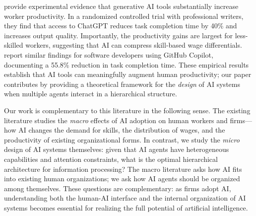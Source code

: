 \citet{noy2023experimental} provide experimental evidence that generative AI tools substantially increase worker productivity. In a randomized controlled trial with professional writers, they find that access to ChatGPT reduces task completion time by 40\% and increases output quality. Importantly, the productivity gains are largest for less-skilled workers, suggesting that AI can compress skill-based wage differentials. \citet{peng2023impact} report similar findings for software developers using GitHub Copilot, documenting a 55.8\% reduction in task completion time. These empirical results establish that AI tools can meaningfully augment human productivity; our paper contributes by providing a theoretical framework for the \emph{design} of AI systems when multiple agents interact in a hierarchical structure.

Our work is complementary to this literature in the following sense. The existing literature studies the \emph{macro} effects of AI adoption on human workers and firms---how AI changes the demand for skills, the distribution of wages, and the productivity of existing organizational forms. In contrast, we study the \emph{micro} design of AI systems themselves: given that AI agents have heterogeneous capabilities and attention constraints, what is the optimal hierarchical architecture for information processing? The macro literature asks how AI fits into existing human organizations; we ask how AI agents should be organized among themselves. These questions are complementary: as firms adopt AI, understanding both the human-AI interface and the internal organization of AI systems becomes essential for realizing the full potential of artificial intelligence.




